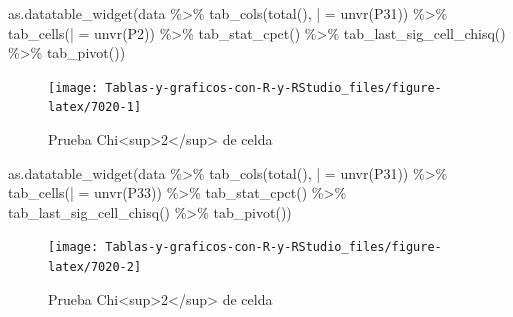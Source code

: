 \documentclass[
]{book}
\newenvironment{Shaded}{\begin{snugshade}}{\end{snugshade}}
\newcommand{\AttributeTok}[1]{\textcolor[rgb]{0.77,0.63,0.00}{#1}}
\newcommand{\FunctionTok}[1]{\textcolor[rgb]{0.00,0.00,0.00}{#1}}
\newcommand{\NormalTok}[1]{#1}
\newcommand{\OtherTok}[1]{\textcolor[rgb]{0.56,0.35,0.01}{#1}}
\newcommand{\SpecialCharTok}[1]{\textcolor[rgb]{0.00,0.00,0.00}{#1}}
\newcommand{\StringTok}[1]{\textcolor[rgb]{0.31,0.60,0.02}{#1}}
\begin{document}
\begin{Shaded}
\begin{Highlighting}[]
\FunctionTok{as.datatable\_widget}\NormalTok{(data }\SpecialCharTok{\%\textgreater{}\%}
  \FunctionTok{tab\_cols}\NormalTok{(}\FunctionTok{total}\NormalTok{(), }\StringTok{\textasciigrave{}}\AttributeTok{|}\StringTok{\textasciigrave{}} \OtherTok{=} \FunctionTok{unvr}\NormalTok{(P31)) }\SpecialCharTok{\%\textgreater{}\%}
  \FunctionTok{tab\_cells}\NormalTok{(}\StringTok{\textasciigrave{}}\AttributeTok{|}\StringTok{\textasciigrave{}} \OtherTok{=} \FunctionTok{unvr}\NormalTok{(P2)) }\SpecialCharTok{\%\textgreater{}\%}
  \FunctionTok{tab\_stat\_cpct}\NormalTok{() }\SpecialCharTok{\%\textgreater{}\%}
  \FunctionTok{tab\_last\_sig\_cell\_chisq}\NormalTok{() }\SpecialCharTok{\%\textgreater{}\%}
  \FunctionTok{tab\_pivot}\NormalTok{())}
\end{Highlighting}
\end{Shaded}

\begin{figure}[H]

{\centering \texttt{[image: Tablas-y-graficos-con-R-y-RStudio\_files/figure-latex/7020-1]} 

}

\caption{Prueba Chi<sup>2</sup> de celda}\label{fig:7020}
\end{figure}

\begin{Shaded}
\begin{Highlighting}[]
\FunctionTok{as.datatable\_widget}\NormalTok{(data }\SpecialCharTok{\%\textgreater{}\%}
  \FunctionTok{tab\_cols}\NormalTok{(}\FunctionTok{total}\NormalTok{(), }\StringTok{\textasciigrave{}}\AttributeTok{|}\StringTok{\textasciigrave{}} \OtherTok{=} \FunctionTok{unvr}\NormalTok{(P31)) }\SpecialCharTok{\%\textgreater{}\%}
  \FunctionTok{tab\_cells}\NormalTok{(}\StringTok{\textasciigrave{}}\AttributeTok{|}\StringTok{\textasciigrave{}} \OtherTok{=} \FunctionTok{unvr}\NormalTok{(P33)) }\SpecialCharTok{\%\textgreater{}\%}
  \FunctionTok{tab\_stat\_cpct}\NormalTok{() }\SpecialCharTok{\%\textgreater{}\%}
  \FunctionTok{tab\_last\_sig\_cell\_chisq}\NormalTok{() }\SpecialCharTok{\%\textgreater{}\%}
  \FunctionTok{tab\_pivot}\NormalTok{())}
\end{Highlighting}
\end{Shaded}

\begin{figure}[H]

{\centering \texttt{[image: Tablas-y-graficos-con-R-y-RStudio\_files/figure-latex/7020-2]} 

}

\caption{Prueba Chi<sup>2</sup> de celda}\label{fig:7020}
\end{figure}
\end{document}
